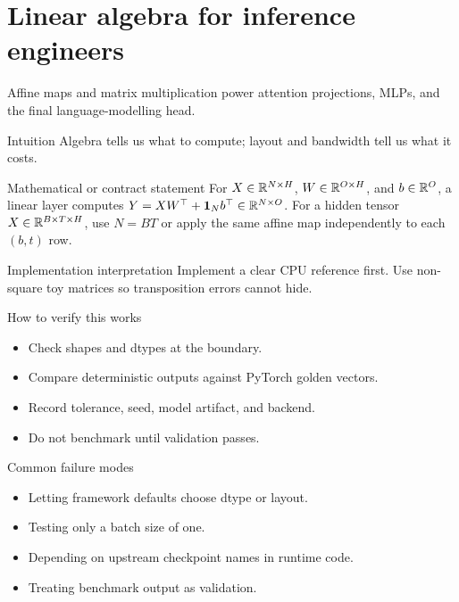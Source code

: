 \chapter{Linear algebra for inference engineers}
\label{ch:linear-algebra}
Affine maps and matrix multiplication power attention projections, MLPs, and the final language-modelling head.



\begin{intuitionbox}{Intuition}
Algebra tells us what to compute; layout and bandwidth tell us what it costs.
\end{intuitionbox}

\begin{definitionbox}{Mathematical or contract statement}
For \(X\in\mathbb{R}^{N\times H}\), \(W\in\mathbb{R}^{O\times H}\), and \(b\in\mathbb{R}^O\), a linear layer computes \(Y=XW^\top+\mathbf{1}_N b^\top\in\mathbb{R}^{N\times O}\). For a hidden tensor \(X\in\mathbb{R}^{B\times T\times H}\), use \(N=BT\) or apply the same affine map independently to each \((b,t)\) row.
\end{definitionbox}

\begin{implementationbox}{Implementation interpretation}
Implement a clear CPU reference first. Use non-square toy matrices so transposition errors cannot hide.
\end{implementationbox}

\begin{verificationbox}{How to verify this works}
\begin{itemize}
\item Check shapes and dtypes at the boundary.
\item Compare deterministic outputs against PyTorch golden vectors.
\item Record tolerance, seed, model artifact, and backend.
\item Do not benchmark until validation passes.
\end{itemize}
\end{verificationbox}

\begin{warningbox}{Common failure modes}
\begin{itemize}
\item Letting framework defaults choose dtype or layout.
\item Testing only a batch size of one.
\item Depending on upstream checkpoint names in runtime code.
\item Treating benchmark output as validation.
\end{itemize}
\end{warningbox}

